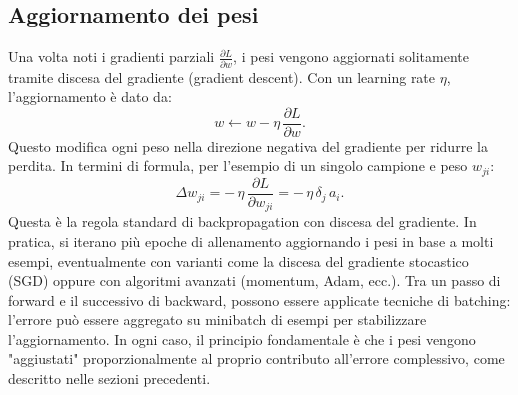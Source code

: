 \documentclass[a4paper,12pt]{report}
\begin{document}
	\subsection{Aggiornamento dei pesi}
	Una volta noti i gradienti parziali $\frac{\partial L}{\partial w}$, i pesi vengono aggiornati solitamente tramite discesa del gradiente (gradient descent). Con un learning rate $\eta$, l'aggiornamento è dato da:
	\[
	w \leftarrow w - \eta\,\frac{\partial L}{\partial w}.
	\]
	Questo modifica ogni peso nella direzione negativa del gradiente per ridurre la perdita. In termini di formula, per l'esempio di un singolo campione e peso $w_{ji}$:
	\[
	\Delta w_{ji} = -\,\eta\,\frac{\partial L}{\partial w_{ji}} = -\,\eta\,\delta_j\,a_i.
	\]
	Questa è la regola standard di backpropagation con discesa del gradiente. In pratica, si iterano più epoche di allenamento aggiornando i pesi in base a molti esempi, eventualmente con varianti come la discesa del gradiente stocastico (SGD) oppure con algoritmi avanzati (momentum, Adam, ecc.). Tra un passo di forward e il successivo di backward, possono essere applicate tecniche di batching: l'errore può essere aggregato su minibatch di esempi per stabilizzare l'aggiornamento. In ogni caso, il principio fondamentale è che i pesi vengono "aggiustati" proporzionalmente al proprio contributo all'errore complessivo, come descritto nelle sezioni precedenti.
	
\end{document}
